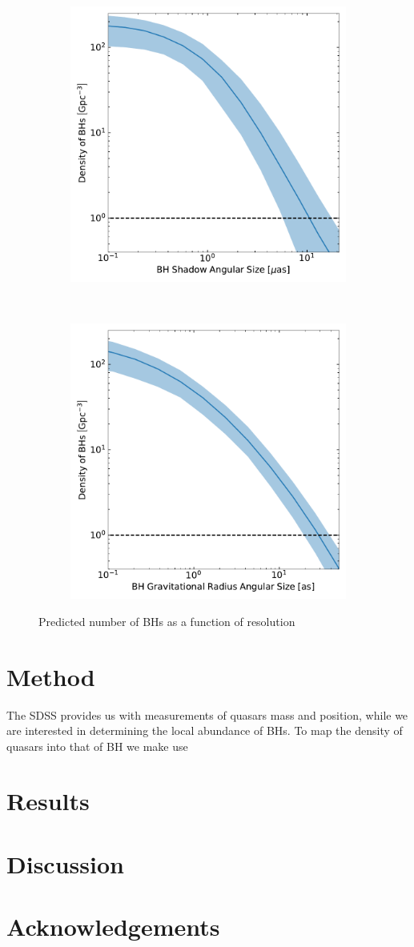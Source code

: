 \documentclass[RNAAS,twocolumn]{aastex63}
\begin{document}
\begin{figure}
    \centering
    \begin{subfigure}
        \centering
        \includegraphics[width=0.48\linewidth]{Figs/tot_shad.pdf}
    \end{subfigure}
    ~
    \begin{subfigure}
        \centering
        \includegraphics[width=0.48\linewidth]{Figs/tot_grav.pdf}
    \end{subfigure}
    \caption{Predicted number of BHs as a function of resolution \label{fig:Total_No.}}
\end{figure}


\section{Method}
The SDSS provides us with measurements of quasars mass and position, while we are interested in determining the local abundance of BHs. To map the density of quasars into that of BH we make use 

\section{Results}




\section{Discussion}


\section*{Acknowledgements}




\end{document}
